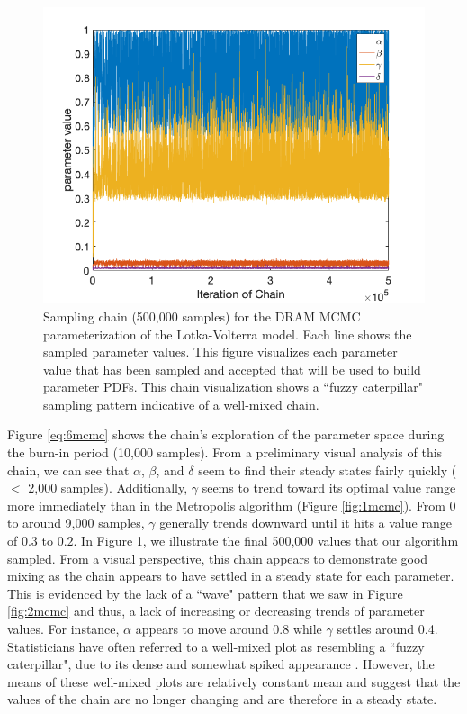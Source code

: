 \begin{figure}[H]
    \centering
    \includegraphics[width=15cm]{MCMC_figs/met_lv_final/final_dram_chain.png}
    \caption{Sampling chain (500,000 samples) for the DRAM MCMC parameterization of the Lotka-Volterra model. Each line shows the sampled parameter values. This figure visualizes each parameter value that has been sampled and accepted that will be used to build parameter PDFs. This chain visualization shows a ``fuzzy caterpillar" sampling pattern indicative of a well-mixed chain.}
    \label{fig:7mcmc}
\end{figure}
Figure \ref{eq:6mcmc} shows the chain's exploration of the parameter space during the burn-in period (10,000 samples). From a preliminary visual analysis of this chain, we can see that $\alpha$, $\beta$, and $\delta$ seem to find their steady states fairly quickly ($<$ 2,000 samples). Additionally, $\gamma$ seems to trend toward its optimal value range more immediately than in the Metropolis algorithm (Figure \ref{fig:1mcmc}). From 0 to around 9,000 samples, $\gamma$ generally trends downward until it hits a value range of $0.3$ to $0.2$. In Figure \ref{fig:7mcmc}, we illustrate the final 500,000 values that our algorithm sampled. From a visual perspective, this chain appears to demonstrate good mixing as the chain appears to have settled in a steady state for each parameter. This is evidenced by the lack of a ``wave" pattern that we saw in Figure \ref{fig:2mcmc} and thus, a lack of increasing or decreasing trends of parameter values. For instance, $\alpha$ appears to move around 0.8 while $\gamma$ settles around 0.4. Statisticians have often referred to a well-mixed plot as resembling a ``fuzzy caterpillar", due to its dense and somewhat spiked appearance \cite{fuzzy_caterpillar}. However, the means of these well-mixed plots are relatively constant mean and suggest that the values of the chain are no longer changing and are therefore in a steady state.
